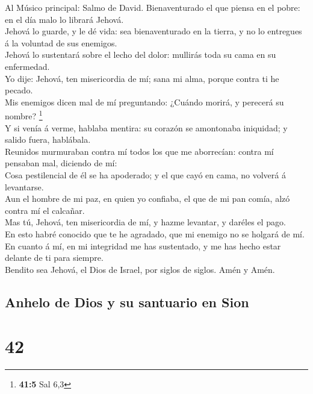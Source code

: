  Al Músico principal: Salmo de David. Bienaventurado el que
piensa en el pobre: en el día malo lo librará Jehová.\\
 Jehová lo guarde, y le dé vida: sea bienaventurado en la
tierra, y no lo entregues á la voluntad de sus enemigos.\\
 Jehová lo sustentará sobre el lecho del dolor: mullirás
toda su cama en su enfermedad.\\
 Yo dije: Jehová, ten misericordia de mí; sana mi alma,
porque contra ti he pecado.\\
 Mis enemigos dicen mal de mí preguntando: ¿Cuándo morirá, y
perecerá su nombre? \footnote{\textbf{41:5} Sal 6,3}\\
 Y si venía á verme, hablaba mentira: su corazón se
amontonaba iniquidad; y salido fuera, hablábala.\\
 Reunidos murmuraban contra mí todos los que me aborrecían:
contra mí pensaban mal, diciendo de mí:\\
 Cosa pestilencial de él se ha apoderado; y el que cayó en
cama, no volverá á levantarse.\\
 Aun el hombre de mi paz, en quien yo confiaba, el que de mi
pan comía, alzó contra mí el calcañar.\\
 Mas tú, Jehová, ten misericordia de mí, y hazme levantar,
y daréles el pago.\\
 En esto habré conocido que te he agradado, que mi enemigo
no se holgará de mí.\\
 En cuanto á mí, en mi integridad me has sustentado, y me
has hecho estar delante de ti para siempre.\\
 Bendito sea Jehová, el Dios de Israel, por siglos de
siglos. Amén y Amén.

\hypertarget{anhelo-de-dios-y-su-santuario-en-sion}{%
\subsection{Anhelo de Dios y su santuario en
Sion}\label{anhelo-de-dios-y-su-santuario-en-sion}}

\hypertarget{section-41}{%
\section{42}\label{section-41}}

